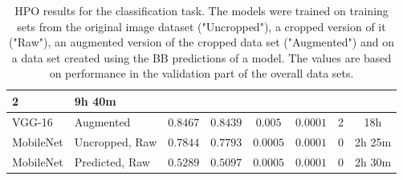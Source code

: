 \begin{landscape}
\begin{table}[!ht]
\begin{tabular}{|l|l|c|c|c|c|c|c|}
        2 &
        9h 40m\\
        \hline
        VGG-16 &
        Augmented &
        $0.8467$ &
        $0.8439$ &
        $0.005$ &
        $0.0001$ &
        2 &
        18h\\
        \hline
        \hline
        MobileNet \label{res:mobilenet-uncropped} &
        Uncropped, Raw
         &
        $0.7844$ &
        $0.7793$ &
        $0.0005$ &
        $0.0001$ &
        0 &
        2h 25m
        \\
        \hline
        \hline
        MobileNet \label{res:mobilenet-predicted} &
        Predicted, Raw
         &
        $0.5289$ & $0.5097$ &
        $0.0005$ & $0.0001$ & 0 & 2h 30m\\
        \hline
    \end{tabular}
    \caption{HPO results for the classification task. The models were trained on training sets from the original image dataset ("Uncropped"), a cropped version of it ("Raw"), an augmented version of the cropped data set ("Augmented") and on a data set created using the BB predictions of a model. The values are based on performance in the validation part of the overall data sets.}
    \label{fig:classification-results}
\end{table}

\end{landscape}
